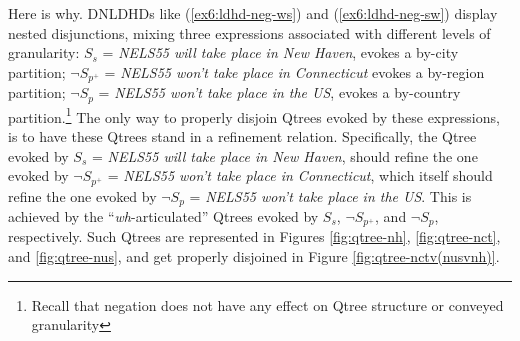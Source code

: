 Here is why. DNLDHDs like (\ref{ex6:ldhd-neg-ws}) and (\ref{ex6:ldhd-neg-sw}) display nested disjunctions, mixing three expressions associated with different levels of granularity: $S_s$ = \textit{NELS55 will take place in New Haven}, evokes a by-city partition; $\neg S_{p^+}$ = \textit{NELS55 won't take place in Connecticut} evokes a by-region partition; $\neg S_{p}$ = \textit{NELS55 won't take place in the US}, evokes a by-country partition.\footnote{Recall that negation does not have any effect on Qtree structure or conveyed granularity} The only way to properly disjoin Qtrees evoked by these expressions, is to have these Qtrees stand in a refinement relation. Specifically, the Qtree evoked by $S_s$ = \textit{NELS55 will take place in New Haven}, should refine the one evoked by $\neg S_{p^+}$ = \textit{NELS55 won't take place in Connecticut}, which itself should refine the one evoked by $\neg S_{p}$ = \textit{NELS55 won't take place in the US}. This is achieved by the ``\textit{wh}-articulated'' Qtrees evoked by $S_s$, $\neg S_{p^+}$, and $\neg S_{p}$, respectively. Such Qtrees are represented in Figures \ref{fig:qtree-nh}, \ref{fig:qtree-nct}, and \ref{fig:qtree-nus}, and get properly disjoined in Figure \ref{fig:qtree-nctv(nusvnh)}.

